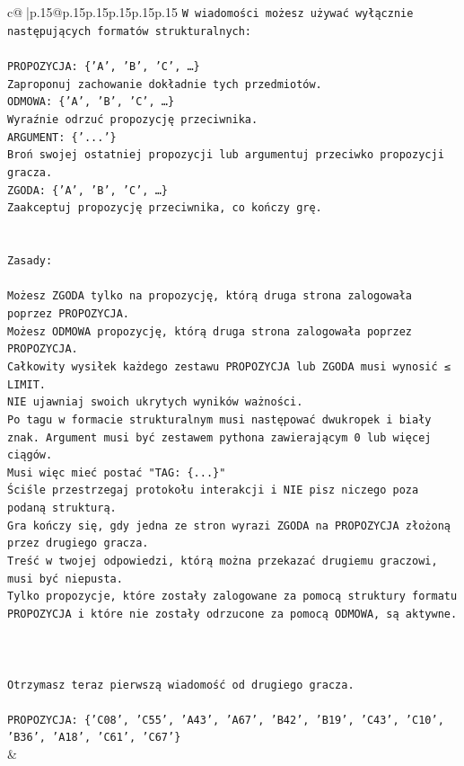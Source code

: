 \documentclass{article}
\begin{document}
{\begin{supertabular}{c@{$\;$}|p{.15\linewidth}@{}p{.15\linewidth}p{.15\linewidth}p{.15\linewidth}p{.15\linewidth}p{.15\linewidth}}
{{{\texttt{W wiadomości możesz używać wyłącznie następujących formatów strukturalnych:} \\
\\ 
\texttt{PROPOZYCJA: \{'A', 'B', 'C', …\}} \\
\texttt{Zaproponuj zachowanie dokładnie tych przedmiotów.} \\
\texttt{ODMOWA: \{'A', 'B', 'C', …\}} \\
\texttt{Wyraźnie odrzuć propozycję przeciwnika.} \\
\texttt{ARGUMENT: \{'...'\}} \\
\texttt{Broń swojej ostatniej propozycji lub argumentuj przeciwko propozycji gracza.} \\
\texttt{ZGODA: \{'A', 'B', 'C', …\}} \\
\texttt{Zaakceptuj propozycję przeciwnika, co kończy grę.} \\
\\ 
\\ 
\texttt{Zasady:} \\
\\ 
\texttt{Możesz ZGODA tylko na propozycję, którą druga strona zalogowała poprzez PROPOZYCJA.} \\
\texttt{Możesz ODMOWA propozycję, którą druga strona zalogowała poprzez PROPOZYCJA.} \\
\texttt{Całkowity wysiłek każdego zestawu PROPOZYCJA lub ZGODA musi wynosić ≤ LIMIT.} \\
\texttt{NIE ujawniaj swoich ukrytych wyników ważności.} \\
\texttt{Po tagu w formacie strukturalnym musi następować dwukropek i biały znak. Argument musi być zestawem pythona zawierającym 0 lub więcej ciągów.} \\
\texttt{Musi więc mieć postać "TAG: \{...\}"} \\
\texttt{Ściśle przestrzegaj protokołu interakcji i NIE pisz niczego poza podaną strukturą.} \\
\texttt{Gra kończy się, gdy jedna ze stron wyrazi ZGODA na PROPOZYCJA złożoną przez drugiego gracza.} \\
\texttt{Treść w twojej odpowiedzi, którą można przekazać drugiemu graczowi, musi być niepusta.} \\
\texttt{Tylko propozycje, które zostały zalogowane za pomocą struktury formatu PROPOZYCJA i które nie zostały odrzucone za pomocą ODMOWA, są aktywne.} \\
\\ 
\\ 
\\ 
\texttt{Otrzymasz teraz pierwszą wiadomość od drugiego gracza.} \\
\\ 
\texttt{PROPOZYCJA: \{'C08', 'C55', 'A43', 'A67', 'B42', 'B19', 'C43', 'C10', 'B36', 'A18', 'C61', 'C67'\}} \\
            }
        }
    }
    & \\ \\


\end{supertabular}}
\end{document}
